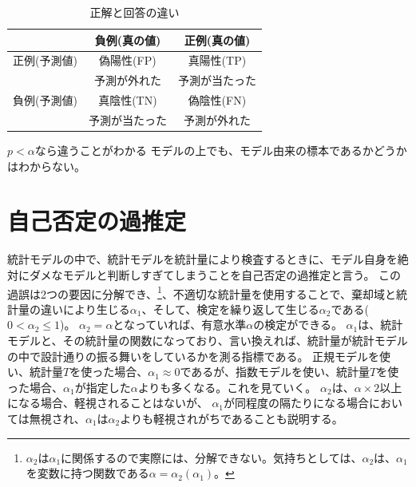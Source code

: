     
    \begin{table}[hbtp]
    \caption{正解と回答の違い}
    \label{table:Yes_no_answer}
    \centering
    \begin{tabular}{ccc}
          &  負例(真の値) & 正例(真の値)  \\
        \hline \hline
        正例(予測値) &  偽陽性(FP)  & 真陽性(TP)\\
        &予測が外れた & 予測が当たった\\
        負例(予測値) & 真陰性(TN) & 偽陰性(FN)\\
        & 予測が当たった & 予測が外れた\\
        \hline
    \end{tabular}
    \end{table}

    

\begin{SMbox}{$p<\alpha$なら違うことがわかる}
    モデルの上でも、モデル由来の標本であるかどうかはわからない。
\end{SMbox}


\section{自己否定の過推定}
統計モデルの中で、統計モデルを統計量により検査するときに、モデル自身を絶対にダメなモデルと判断しすぎてしまうことを自己否定の過推定と言う。
この過誤は2つの要因に分解でき、\footnote{$\alpha_2$は$\alpha_1$に関係するので実際には、分解できない。気持ちとしては、$\alpha_2$は、$\alpha_1$を変数に持つ関数である$\alpha=\alpha_2(\alpha_1)$。}、不適切な統計量を使用することで、棄却域と統計量の違いにより生じる$\alpha_1$、そして、検定を繰り返して生じる$\alpha_2$である($0<\alpha_2 \leq 1$)。
$\alpha_2=\alpha$となっていれば、有意水準$\alpha$の検定ができる。
$\alpha_1$は、統計モデルと、その統計量の関数になっており、言い換えれば、統計量が統計モデルの中で設計通りの振る舞いをしているかを測る指標である。
正規モデルを使い、統計量$T$を使った場合、$\alpha_1 \approx	 0 $であるが、指数モデルを使い、統計量$T$を使った場合、$\alpha_1$が指定した$\alpha$よりも多くなる。これを見ていく。
$\alpha_2$は、$\alpha\times 2$以上になる場合、軽視されることはないが、
$\alpha_1$が同程度の隔たりになる場合においては無視され、$\alpha_1$は$\alpha_2$よりも軽視されがちであることも説明する。




